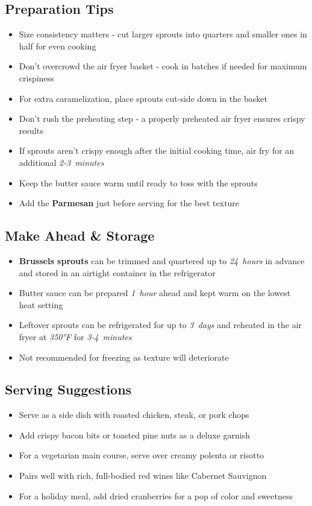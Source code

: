 \documentclass[11pt,letterpaper]{article}
\begin{document}
{\begin{multicols}{2}
\subsection*{Preparation Tips}
\begin{itemize}
    \item Size consistency matters - cut larger sprouts into quarters and smaller ones in half for even cooking
    \item Don't overcrowd the air fryer basket - cook in batches if needed for maximum crispiness
    \item For extra caramelization, place sprouts cut-side down in the basket
    \item Don't rush the preheating step - a properly preheated air fryer ensures crispy results
    \item If sprouts aren't crispy enough after the initial cooking time, air fry for an additional \textit{2-3~minutes}
    \item Keep the butter sauce warm until ready to toss with the sprouts
    \item Add the \textbf{Parmesan} just before serving for the best texture
\end{itemize}

\subsection*{Make Ahead \& Storage}
\begin{itemize}
    \item \textbf{Brussels sprouts} can be trimmed and quartered up to \textit{24~hours} in advance and stored in an airtight container in the refrigerator
    \item Butter sauce can be prepared \textit{1~hour} ahead and kept warm on the lowest heat setting
    \item Leftover sprouts can be refrigerated for up to \textit{3~days} and reheated in the air fryer at \textit{350°F} for \textit{3-4~minutes}
    \item Not recommended for freezing as texture will deteriorate
\end{itemize}

\subsection*{Serving Suggestions}
\begin{itemize}
    \item Serve as a side dish with roasted chicken, steak, or pork chops
    \item Add crispy bacon bits or toasted pine nuts as a deluxe garnish
    \item For a vegetarian main course, serve over creamy polenta or risotto
    \item Pairs well with rich, full-bodied red wines like Cabernet Sauvignon
    \item For a holiday meal, add dried cranberries for a pop of color and sweetness
\end{itemize}

\end{multicols}
}
\end{document}
